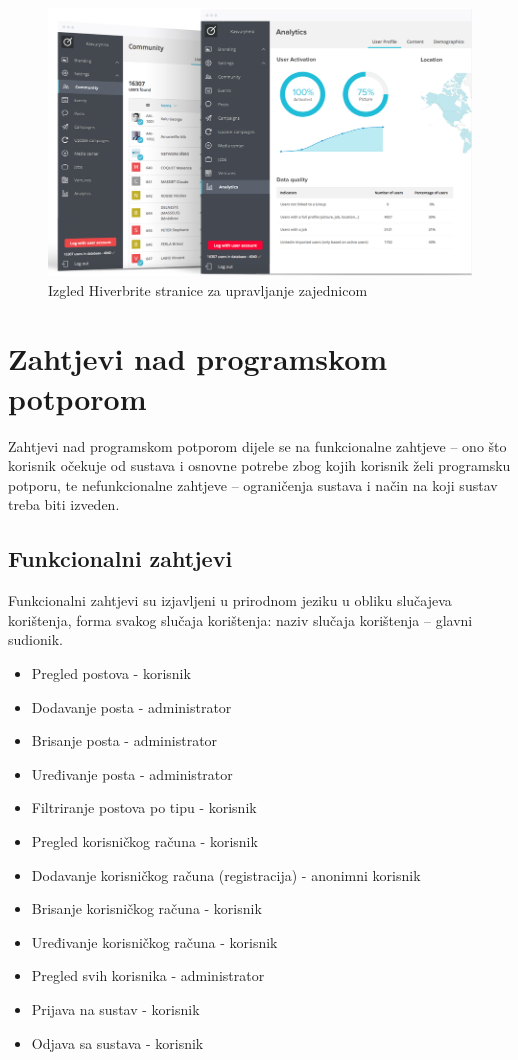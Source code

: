 \documentclass[times, utf8, zavrsni]{fer}
\begin{document}
\begin{figure}[H]
	\centering
	\includegraphics[width=13cm]{slike/hiverbrite-upravljanje.png}
	\caption{Izgled Hiverbrite stranice za upravljanje zajednicom}
	\label{fig:hiverbrite-menagements}
\end{figure}

\chapter{Zahtjevi nad programskom potporom}
Zahtjevi nad programskom potporom dijele se na funkcionalne zahtjeve – ono što korisnik očekuje od sustava i osnovne potrebe zbog kojih korisnik želi programsku potporu, te nefunkcionalne zahtjeve – ograničenja sustava i način na koji sustav treba biti izveden.

\section{Funkcionalni zahtjevi}
Funkcionalni zahtjevi su izjavljeni u prirodnom jeziku u obliku slučajeva korištenja, forma svakog slučaja korištenja: naziv slučaja korištenja – glavni sudionik.

 
\begin{itemize}
	\item Pregled postova - korisnik
	\item Dodavanje posta - administrator
	\item Brisanje posta - administrator
	\item Uređivanje posta - administrator
	\item Filtriranje postova po tipu - korisnik
	\item Pregled korisničkog računa - korisnik
	\item Dodavanje korisničkog računa (registracija) - anonimni korisnik
	\item Brisanje korisničkog računa - korisnik 
	\item Uređivanje korisničkog računa - korisnik
 	\item Pregled svih korisnika - administrator
	\item Prijava na sustav - korisnik 
	\item Odjava sa sustava - korisnik
\end{itemize}
\end{document}
